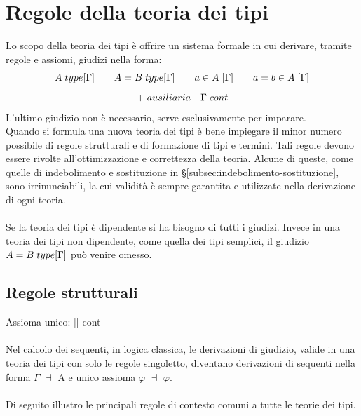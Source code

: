 \documentclass[10pt,a4paper, italian]{book}
\begin{document}
{{{\chapter{Regole della teoria dei tipi}
\label{cap:regole-teoria-dei-tipi}
Lo scopo della teoria dei tipi \`e offrire un sistema formale in cui derivare, tramite regole e assiomi, giudizi nella forma:
\[ A \hspace{0.1cm} type[\Gamma] \qquad
A = B \hspace{0.1cm} type[\Gamma] \qquad
a \in A\hspace{0.1cm} [\Gamma] \qquad
a=b \in A \hspace{0.1cm}[\Gamma]
\]
\[
+ \hspace{0.1cm} ausiliaria \quad \Gamma \hspace{0.1cm} cont
\]
L'ultimo giudizio non \`e necessario, serve esclusivamente per imparare.\\
Quando si formula una nuova teoria dei tipi \`e bene impiegare il minor numero possibile di regole strutturali e di formazione di tipi e termini. Tali regole devono essere rivolte all'ottimizzazione e correttezza della teoria. Alcune di queste, come quelle di indebolimento e sostituzione in \S\ref{subsec:indebolimento-sostituzione}, sono irrinunciabili, la cui validit\`a \`e sempre garantita e utilizzate nella derivazione di ogni teoria.\\\\
Se la teoria dei tipi \`e dipendente si ha bisogno di tutti i giudizi. Invece in una teoria dei tipi non dipendente, come quella dei tipi semplici, il giudizio $A = B \hspace{0.1cm} type[\Gamma]$ pu\`o venire omesso.\\

\section{Regole strutturali}
\label{sec:regole-strutturali}
Assioma unico: [\hspace{0.1cm}] cont\\\\
Nel calcolo dei sequenti, in logica classica, le derivazioni di giudizio, valide in una teoria dei tipi con solo le regole singoletto, diventano derivazioni di sequenti nella forma $\Gamma$ $\dashv$ A e unico assioma $\varphi$ $\dashv$ $\varphi$.
\\\\
Di seguito illustro le principali regole di contesto comuni a tutte le teorie dei tipi.
}}}
\end{document}
